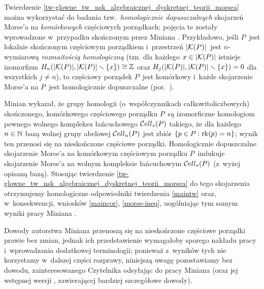 \begin{uw}Twierdzenie \ref{tw-glowne_tw_nsk_algebraicznej_dyskretnej_teorii_morsea} można wykorzystać do badania tzw.~\textit{homologicznie dopuszczalnych} skojarzeń Morse'a na \textit{komórkowych} częściowych porządkach;  pojęcia te zostały wprowadzone w~przypadku skończonym przez Miniana \cite{Minian12}. Przykładowo, jeśli $P$~jest lokalnie skończonym częściowym porządkiem i~przestrzeń $|\mathcal{K}(P)|$~jest $n$-wymiarową \textit{rozmaitością homologiczną} (tzn. dla każdego $x\in |\mathcal{K}(P)|$ istnieje izomorfizm $H_n(|\mathcal{K}(P)|,|\mathcal{K}(P)|\smallsetminus\{x\})\cong \mathbb{Z}$ oraz $H_j(|\mathcal{K}(P)|,|\mathcal{K}(P)|\smallsetminus\{x\})=0$ dla wszystkich $j\not=n$), to częściowy porządek $P$~jest komórkowy i~każde skojarzenie Morse'a na $P$~jest homologicznie dopuszczalne (por.~\cite[Theorem 4.6]{Minian12}).

Minian \cite{Minian12} wykazał, że grupy homologii (o~współczynnikach całkowitoliczbowych) skończonego, komórkowego częściowego porządku $P$~są izomorficzne homologiom pewnego wolnego kompleksu łańcuchowego ${\mathcal{C}ell}_*(P)$ takiego, że dla każdego $n\in\mathbb{N}$ bazą wolnej grupy abelowej ${\mathcal{C}ell}_n(P)$ jest zbiór $\{p\in P:\operatorname{rk}(p)=n\}$; wynik ten przenosi się na nieskończone częściowe porządki. Homologicznie dopuszczalne skojarzenie Morse'a na komórkowym częściowym porządku $P$~indukuje skojarzenie Morse'a na wolnym kompleksie łańcuchowym ${\mathcal{C}ell}_*(P)$ (z~wyżej opisaną bazą). Stosując twierdzenie \ref{tw-glowne_tw_nsk_algebraicznej_dyskretnej_teorii_morsea} do tego skojarzenia otrzymujemy homologiczne odpowiedniki twierdzenia \ref{maintw} oraz, w~konsekwencji, wniosków \ref{maincor}, \ref{morse-ineq}, uogólniając tym samym wyniki pracy Miniana \cite{Minian12}. 

Dowody autorstwa Miniana przenoszą się na nieskończone częściowe porządki prawie bez zmian, jednak ich przedstawienie wymagałoby sporego nakładu pracy i~wprowadzania dodatkowej terminologii; ponieważ z~wyników tych nie korzystamy w~dalszej części rozprawy, niniejszą uwagę pozostawiamy bez dowodu, zainteresowanego Czytelnika odsyłając do pracy Miniana \cite{Minian12} (oraz jej wstępnej wersji \cite{Minian}, zawierającej bardziej szczegółowe dowody).
\end{uw}


